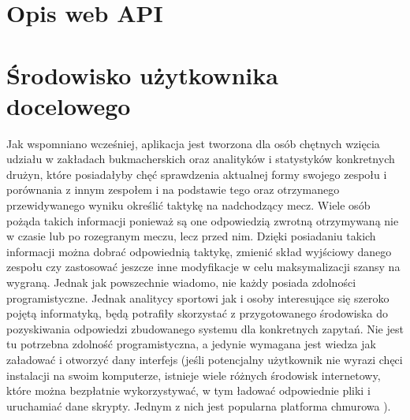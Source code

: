 \section{Opis web API}
\section{Środowisko użytkownika docelowego}
\noindent
Jak wspomniano wcześniej, aplikacja jest tworzona dla osób chętnych wzięcia udziału w zakładach bukmacherskich oraz analityków i statystyków konkretnych drużyn, które posiadałyby chęć sprawdzenia aktualnej formy swojego zespołu i porównania z innym zespołem i na podstawie tego oraz otrzymanego przewidywanego wyniku określić taktykę na nadchodzący mecz. Wiele osób pożąda takich informacji ponieważ są one odpowiedzią zwrotną otrzymywaną nie w czasie lub po rozegranym meczu, lecz przed nim. Dzięki posiadaniu takich informacji można dobrać odpowiednią taktykę, zmienić skład wyjściowy danego zespołu czy zastosować jeszcze inne modyfikacje w celu maksymalizacji szansy na wygraną. Jednak jak powszechnie wiadomo, nie każdy posiada zdolności programistyczne. Jednak analitycy sportowi jak i osoby interesujące się szeroko pojętą informatyką, będą potrafiły skorzystać z przygotowanego środowiska do pozyskiwania odpowiedzi zbudowanego systemu dla konkretnych zapytań. Nie jest tu potrzebna zdolność programistyczna, a jedynie wymagana jest wiedza jak załadować i otworzyć dany interfejs (jeśli potencjalny użytkownik nie wyrazi chęci instalacji  na swoim komputerze, istnieje wiele różnych środowisk internetowy, które można bezpłatnie wykorzystywać, w tym ładować odpowiednie pliki i uruchamiać dane skrypty. Jednym z nich jest popularna platforma chmurowa ). 

